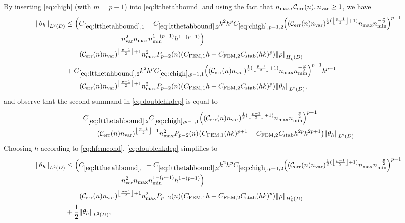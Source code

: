 By inserting \cref{eq:chigh} (with $m=p-1$) into \cref{eq:ltthetahbound} and using the fact that $\nmax, \En, \nvar \geq 1$, we have
\begin{align}
  \NLtD{\thetah}&\leq \Big(\Cfirst + \Csecond k^2h^p\Chighfn{p-1,2}\mleft(\mleft(\En\nvar\mright)^{\half(\floor{\frac{p-1}2}+1)}\nmax\nmin^{-\frac{p}2}\mright)^{p-1}\nonumber\\
  &\quad\quad\quad\quad\quad\quad\quad\quad\nvar^2\nmax\nmin^{1-(p-1)}h^{1-(p-1)} \Big)\nonumber\\
&\quad\quad\mleft(\En \nvar\mright)^{\floor{\frac{p-1}2}+1}\nmax^2\Pfn{p-2}\mleft(n\mright)\mleft(\CFEMotilde h + \CFEMttilde \CAnk (hk)^p\mright)\NHokD{\rho}\nonumber\\
&+\Csecond k^2h^p \Chighfn{p-1,1} \mleft(\mleft(\En\nvar\mright)^{\half(\floor{\frac{p-1}2}+1)}\nmax\nmin^{-\frac{p}2}\mright)^{p-1}k^{p-1}\nonumber\\
&\quad\quad\mleft(\En \nvar\mright)^{\floor{\frac{p-1}2}+1}\nmax^2\Pfn{p-2}\mleft(n\mright)\mleft(\CFEMotilde h+ \CFEMttilde \CAnk (hk)^p\mright)\NLtD{\thetah},\label{eq:doublehkdep}
\end{align}
\label{page:thmfembound}
and observe that the second summand in \cref{eq:doublehkdep} is equal to
\begin{align*}
  &\Csecond \Chighfn{p-1,1} \mleft(\mleft(\En\nvar\mright)^{\half(\floor{\frac{p-1}2}+1)}\nmax\nmin^{-\frac{p}2}\mright)^{p-1}\\
  &\quad\quad\mleft(\En \nvar\mright)^{\floor{\frac{p-1}2}+1}\nmax^2\Pfn{p-2}\mleft(n\mright)\mleft(\CFEMotilde (hk)^{p+1}+ \CFEMttilde \CAnk h^{2p}k^{2p+1}\mright)\NLtD{\thetah}
\end{align*}
Choosing $h$ according to \cref{eq:hfemcond}, \cref{eq:doublehkdep} simplifies to
\begin{align*}
  \NLtD{\thetah} &\leq\Big(\Cfirst + \Csecond k^2h^p\Chighfn{p-1,2}\mleft(\mleft(\En\nvar\mright)^{\half(\floor{\frac{p-1}2}+1)}\nmax\nmin^{-\frac{p}2}\mright)^{p-1}\nonumber\\
  &\quad\quad\quad\quad\quad\quad\quad\quad\nvar^2\nmax\nmin^{1-(p-1)}h^{1-(p-1)} \Big)\nonumber\\
  &\quad\quad\mleft(\En \nvar\mright)^{\floor{\frac{p-1}2}+1}\nmax^2\Pfn{p-2}\mleft(n\mright)\mleft(\CFEMotilde h + \CFEMttilde \CAnk (hk)^p\mright)\NHokD{\rho}\\
  &+ \half \NLtD{\thetah},
\end{align*}

